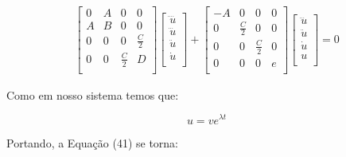 \documentclass[a4paper,12p]{article}
\begin{document}
	\begin{equation}
	\begin{gathered}
	\begin{bmatrix}
	0&A&0&0 \\
	A&B&0&0 \\
	0&0&0&\frac{C}{2} \\
	0&0&\frac{C}{2}&D \\
	\end{bmatrix}
	\begin{bmatrix}
	\ddddot{u}\\
	\dddot{u}\\
	\ddot{u}\\
	\dot{u}\\
	\end{bmatrix}
	+
	\begin{bmatrix}
	-A&0&0&0 \\
	0&\frac{C}{2}&0&0 \\
	0&0&\frac{C}{2}&0 \\
	0&0&0&e \\
	\end{bmatrix}
	\begin{bmatrix}
	\dddot{u}\\
	\ddot{u}\\
	\dot{u}\\
	u\\
	\end{bmatrix}
	=
	0
	\end{gathered}
	\end{equation}
	
	Como em nosso sistema temos que:
	
	\begin{equation}
	u=v e^{\lambda t}
	\end{equation}
	
	Portando, a Equação (41) se torna:
	
\end{document}
